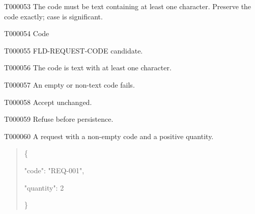 \documentclass[11pt,a4paper]{article}
\begin{document}
\begin{atlasparagraph}{T000053}
The code must be text containing at least one character. Preserve the code exactly; case is significant.
\end{atlasparagraph}
\begin{atlastext}{T000054}
Code
\end{atlastext}
\begin{atlasparagraph}{T000055}
FLD-REQUEST-CODE candidate.
\end{atlasparagraph}
\begin{atlastext}{T000056}
The code is text with at least one character.
\end{atlastext}
\begin{atlasparagraph}{T000057}
An empty or non-text code fails.
\end{atlasparagraph}
\begin{atlasparagraph}{T000058}
Accept unchanged.
\end{atlasparagraph}
\begin{atlasparagraph}{T000059}
Refuse before persistence.
\end{atlasparagraph}
\begin{atlasparagraph}{T000060}
A request with a non-empty code and a positive quantity.
\end{atlasparagraph}
\par\noindent\begin{minipage}{\linewidth}
\begin{quote}\small\ttfamily\raggedright
\noindent \{\par
\noindent   "code":\allowbreak{} "REQ-\allowbreak{}001",\par
\noindent   "quantity":\allowbreak{} 2\par
\noindent \}\par
\end{quote}
\end{minipage}\par
\end{document}
